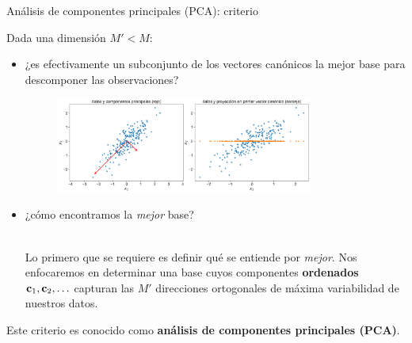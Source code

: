 \documentclass[9pt, handout]{beamer}
\begin{document}
\begin{frame}{Análisis de componentes principales (PCA): criterio}
	
	Dada una dimensión $M'<M$:    	
	\begin{itemize}
		\item ¿es efectivamente un subconjunto de los vectores canónicos la mejor base para descomponer las observaciones? \pause
		\begin{figure}[H]
	\centering
	\includegraphics[width=0.8\textwidth]{../img/cap6_pca.pdf}
	\end{figure}\pause

		\item ¿cómo encontramos la \emph{mejor} base?\\~\ \pause
		
		Lo primero que se requiere es definir qué se entiende por \emph{mejor}. Nos enfocaremos en determinar una base cuyos componentes \textbf{ordenados} $\mathbf{c}_1,\mathbf{c}_2,\ldots$ capturan las $M'$ direcciones ortogonales de máxima variabilidad de nuestros datos.
	\end{itemize}
	Este criterio es conocido como \textbf{análisis de componentes principales (PCA)}.
\end{frame}
\end{document}
